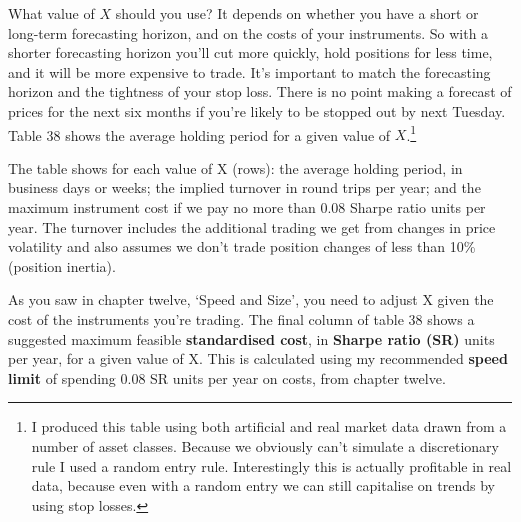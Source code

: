 What value of \(X\) should you use? It depends on whether you have a short or long-term forecasting horizon, and on the costs of your instruments. So with a shorter forecasting horizon you’ll cut more quickly, hold positions for less time, and it will be more expensive to trade. It’s important to match the forecasting horizon and the tightness of your stop loss. There is no point making a forecast of prices for the next six months if you’re likely to be stopped out by next Tuesday. Table 38 shows the average holding period for a given value of \(X\).\footnote{I produced this table using both artificial and real market data drawn from a number of asset classes. Because we obviously can’t simulate a discretionary rule I used a random entry rule. Interestingly this is actually profitable in real data, because even with a random entry we can still capitalise on trends by using stop losses.}

 

The table shows for each value of X (rows): the average holding period, in business days or weeks; the implied turnover in round trips per year; and the maximum instrument cost if we pay no more than 0.08 Sharpe ratio units per year. The turnover includes the additional trading we get from changes in price volatility and also assumes we don't trade position changes of less than 10\% (position inertia).

As you saw in chapter twelve, ‘Speed and Size', you need to adjust X given the cost of the instruments you're trading. The final column of table 38 shows a suggested maximum feasible \textbf{standardised cost}, in \textbf{Sharpe ratio (SR)} units per year, for a given value of X. This is calculated using my recommended \textbf{speed limit} of spending 0.08 SR units per year on costs, from chapter twelve.


